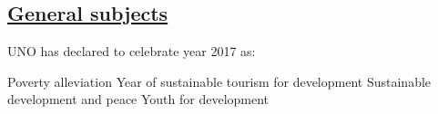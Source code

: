 \begin{questions}
\question
  \begin{choices}
  \choice
  \choice
  \choice
  \choice
  \end{choices}

\question
  \begin{choices}
  \choice
  \choice
  \choice
  \choice
  \end{choices}

\question
  \begin{choices}
  \choice
  \choice
  \choice
  \choice
  \end{choices}

\question
  \begin{choices}
  \choice
  \choice
  \choice
  \choice
  \end{choices}

\question
  \begin{choices}
  \choice
  \choice
  \choice
  \choice
  \end{choices}

\question
  \begin{choices}
  \choice
  \choice
  \choice
  \choice
  \end{choices}

\question
  \begin{choices}
  \choice
  \choice
  \choice
  \choice
  \end{choices}

\question
  \begin{choices}
  \choice
  \choice
  \choice
  \choice
  \end{choices}

\question
  \begin{choices}
  \choice
  \choice
  \choice
  \choice
  \end{choices}

\question
  \begin{choices}
  \choice
  \choice
  \choice
  \choice
  \end{choices}



\subsection*{\underline{General subjects}}

\question UNO has declared to celebrate year 2017 as:
  \begin{choices}
  \choice Poverty alleviation
  \choice Year of sustainable tourism for development
  \choice Sustainable development and peace
  \choice Youth for development
  \end{choices}


\end{questions}
